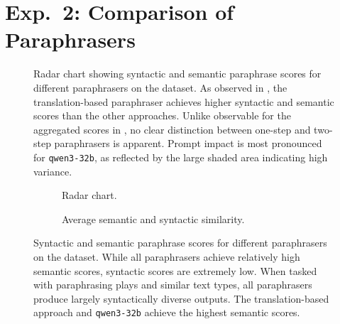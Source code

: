 \section{Exp.\ 2: Comparison of Paraphrasers}
\label{sec:app_paraphrases}

\begin{figure}[H]
    \centering
    
    \caption[Paraphrase evaluation radar chart on the \dataBlog{} dataset]{
        Radar chart showing syntactic and semantic paraphrase scores for different paraphrasers on the \dataBlog{} dataset. 
        As observed in , the translation-based paraphraser achieves higher syntactic and semantic scores than the other approaches. 
        Unlike observable for the aggregated scores in , no clear distinction between one-step and two-step paraphrasers is apparent.
        Prompt impact is most pronounced for \texttt{qwen3-32b}, as reflected by the large shaded area indicating high variance.
    }
    \label{fig:radar_blog}
\end{figure}

\begin{figure}[H]
    \begin{subfigure}[b]{0.95\textwidth}
        \centering
        
        \caption[Paraphrase evaluation radar chart on the \dataGutenberg{} dataset]{
            Radar chart.
            }
        \label{fig:radar_gutenberg}
    \end{subfigure}

    \hfill

    \centering
    \begin{subfigure}[b]{0.95\textwidth}
        \centering
        
        \caption[Comparison of paraphrasers on the \dataGutenberg{} dataset]{
            Average semantic and syntactic similarity.
        }
        \label{fig:avg_sem_syn_gutenberg}
    \end{subfigure}

    \caption[Paraphrase scores on the \dataGutenberg{} dataset]{
            Syntactic and semantic paraphrase scores for different paraphrasers on the \dataGutenberg{} dataset.
            While all paraphrasers achieve relatively high semantic scores, syntactic scores are extremely low. 
            When tasked with paraphrasing plays and similar text types, all paraphrasers produce largely syntactically diverse outputs. 
            The translation-based approach and \texttt{qwen3-32b} achieve the highest semantic scores.}
    \label{fig:sem_syn_gutenberg}
\end{figure}
